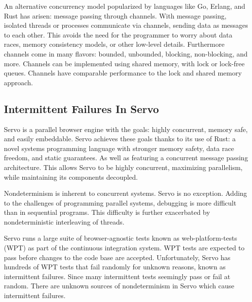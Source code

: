 \documentclass{article}
\begin{document}
An alternative concurrency model popularized by languages like Go, Erlang, and Rust has
arisen: message passing through channels. With message passing, isolated
threads or processes communicate via channels, sending data as messages to each other.
This avoids the need for the programmer to worry about data races, memory consistency
models, or other low-level details. Furthermore channels come in many flavors:
bounded, unbounded, blocking, non-blocking, and more. Channels can be implemented using
shared memory, with lock or lock-free queues. Channels have comparable performance to the
lock and shared memory approach.

\subsection{Intermittent Failures In Servo}
Servo is a parallel browser engine with the goals: highly concurrent,
memory safe, and easily embeddable. Servo achieves these goals thanks to
its use of Rust: a novel systems programming language with stronger memory safety,
data race freedom, and static guarantees. As well as featuring a concurrent message passing
architecture. This allows Servo to be highly concurrent, maximizing parallelism,
while maintaining its components decoupled.

Nondeterminism is inherent to concurrent systems. Servo is no exception. Adding to
the challenges of programming parallel systems, debugging is more difficult than in
sequential programs. This difficulty is further exacerbated by nondeterministic
interleaving of threads.

Servo runs a large suite of browser-agnostic tests known as web-platform-tests (WPT)
as part of the continuous integration system. WPT tests are expected to pass before
changes to the code base are accepted. Unfortunately, Servo has hundreds of WPT tests that
fail randomly for unknown reasons, known as intermittent failures. Since many intermittent
tests seemingly pass or fail at random. There are unknown sources of nondeterminism in
Servo which cause intermittent failures.
\end{document}

